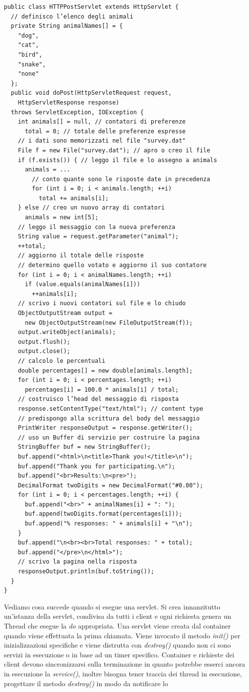 \message{ !name(sd.tex)}\documentclass[a4paper,12pt, oneside]{book}
\begin{document}
\begin{verbatim}
public class HTTPPostServlet extends HttpServlet {
  // definisco l’elenco degli animali
  private String animalNames[] = {
    "dog",
    "cat",
    "bird",
    "snake",
    "none"
  };
  public void doPost(HttpServletRequest request,
    HttpServletResponse response)
  throws ServletException, IOException {
    int animals[] = null, // contatori di preferenze
      total = 0; // totale delle preferenze espresse
    // i dati sono memorizzati nel file "survey.dat"
    File f = new File("survey.dat"); // apro o creo il file
    if (f.exists()) { // leggo il file e lo assegno a animals
      animals = ...
        // conto quante sono le risposte date in precedenza
        for (int i = 0; i < animals.length; ++i)
          total += animals[i];
    } else // creo un nuovo array di contatori
      animals = new int[5];
    // leggo il messaggio con la nuova preferenza
    String value = request.getParameter("animal");
    ++total;
    // aggiorno il totale delle risposte
    // determino quello votato e aggiorno il suo contatore
    for (int i = 0; i < animalNames.length; ++i)
      if (value.equals(animalNames[i]))
        ++animals[i];
    // scrivo i nuovi contatori sul file e lo chiudo
    ObjectOutputStream output =
      new ObjectOutputStream(new FileOutputStream(f));
    output.writeObject(animals);
    output.flush();
    output.close();
    // calcolo le percentuali
    double percentages[] = new double[animals.length];
    for (int i = 0; i < percentages.length; ++i)
      percentages[i] = 100.0 * animals[i] / total;
    // costruisco l’head del messaggio di risposta
    response.setContentType("text/html"); // content type
    // predispongo alla scrittura del body del messaggio
    PrintWriter responseOutput = response.getWriter();
    // uso un Buffer di servizio per costruire la pagina
    StringBuffer buf = new StringBuffer();
    buf.append("<html>\n<title>Thank you!</title>\n");
    buf.append("Thank you for participating.\n");
    buf.append("<br>Results:\n<pre>");
    DecimalFormat twoDigits = new DecimalFormat("#0.00");
    for (int i = 0; i < percentages.length; ++i) {
      buf.append("<br>" + animalNames[i] + ": ");
      buf.append(twoDigits.format(percentages[i]));
      buf.append("% responses: " + animals[i] + "\n");
    }
    buf.append("\n<br><br>Total responses: " + total);
    buf.append("</pre>\n</html>");
    // scrivo la pagina nella risposta
    responseOutput.println(buf.toString());
  }
}
\end{verbatim}
Vediamo cosa succede quando si esegue una servlet. Si crea innanzitutto un'istanza della servlet, condivisa da tutti i client e ogni richiesta genera un Thread che esegue la \textit{do} appropriata. Una servlet viene creata dal container quando viene effettuata la prima chiamata. Viene invocato il metodo \textit{init()} per inizializzazioni specifiche e viene distrutta con \textit{destroy()} quando non ci sono servizi in esecuzione o in base ad un timer specifico. Container e richieste dei client devono sincronizzarsi sulla terminazione in quanto potrebbe esserci ancora in esecuzione la \textit{service()}, inoltre bisogna tener traccia dei thread in esecuzione, progettare il metodo \textit{destroy()} in modo da notificare lo
\end{document}
